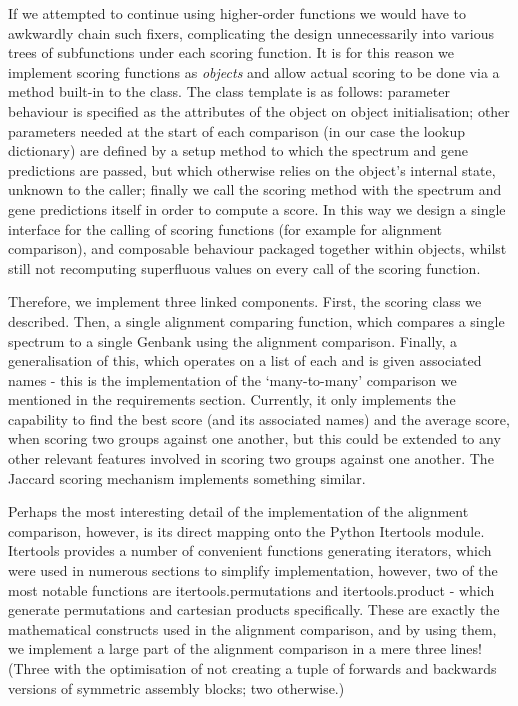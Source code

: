 \documentclass{l4proj}
\begin{document}
If we attempted to continue using higher-order functions we would have to awkwardly chain such fixers, complicating the design unnecessarily into various trees of subfunctions under each scoring function. It is for this reason we implement scoring functions as \textit{objects} and allow actual scoring to be done via a method built-in to the class. The class template is as follows: parameter behaviour is specified as the attributes of the object on object initialisation; other parameters needed at the start of each comparison (in our case the lookup dictionary) are defined by a setup method to which the spectrum and gene predictions are passed, but which otherwise relies on the object's internal state, unknown to the caller; finally we call the scoring method with the spectrum and gene predictions itself in order to compute a score. In this way we design a single interface for the calling of scoring functions (for example for alignment comparison), and composable behaviour packaged together within objects, whilst still not recomputing superfluous values on every call of the scoring function.

Therefore, we implement three linked components. First, the scoring class we described. Then, a single alignment comparing function, which compares a single spectrum to a single Genbank using the alignment comparison. Finally, a generalisation of this, which operates on a list of each and is given associated names - this is the implementation of the `many-to-many' comparison we mentioned in the requirements section. Currently, it only implements the capability to find the best score (and its associated names) and the average score, when scoring two groups against one another, but this could be extended to any other relevant features involved in scoring two groups against one another. The Jaccard scoring mechanism implements something similar.

Perhaps the most interesting detail of the implementation of the alignment comparison, however, is its direct mapping onto the Python Itertools module. Itertools provides a number of convenient functions generating iterators, which were used in numerous sections to simplify implementation, however, two of the most notable functions are itertools.permutations and itertools.product - which generate permutations and cartesian products specifically. These are exactly the mathematical constructs used in the alignment comparison, and by using them, we implement a large part of the alignment comparison in a mere three lines! (Three with the optimisation of not creating a tuple of forwards and backwards versions of symmetric assembly blocks; two otherwise.)
\end{document}
